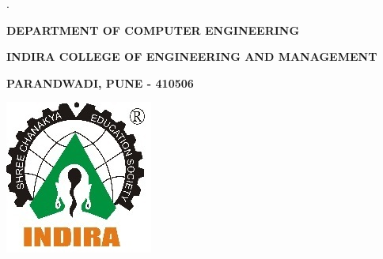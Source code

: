 \fancypage.{%
  \setlength{\fboxsep}{0pt}%
  \setlength{\shadowsize}{0pt}%
  \shadowbox}{}
\linespread{.8}
\begin{center}\textbf{DEPARTMENT OF COMPUTER ENGINEERING}\end{center}
\vspace{-.4cm}
\begin{center}\textbf{INDIRA COLLEGE OF ENGINEERING AND MANAGEMENT} \end{center}
\vspace{-.4cm}
\begin{center}\textbf{PARANDWADI, PUNE - 410506}\end{center}
\vspace{.2in}
\begin{center}
\includegraphics[scale=0.65]{./ilogo}
\end{center}
\vspace{-0.95cm}


